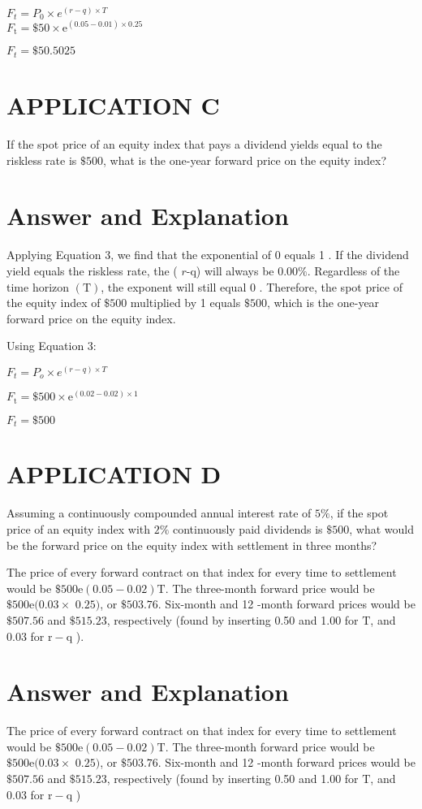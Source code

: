 \documentclass[11pt]{article}
\begin{document}
$F_{t}=P_{0} \times e^{(r-q) \times T}$\\
$F_{\mathrm{t}}=\$ 50 \times \mathrm{e}^{(0.05-0.01) \times 0.25}$

$F_{t}=\$ 50.5025$

\section*{APPLICATION C}
If the spot price of an equity index that pays a dividend yields equal to the riskless rate is $\$ 500$, what is the one-year forward price on the equity index?

\section*{Answer and Explanation}
Applying Equation 3, we find that the exponential of 0 equals 1 . If the dividend yield equals the riskless rate, the ( $r$-q) will always be $0.00 \%$. Regardless of the time horizon $(\mathrm{T})$, the exponent will still equal 0 . Therefore, the spot price of the equity index of $\$ 500$ multiplied by 1 equals $\$ 500$, which is the one-year forward price on the equity index.

Using Equation 3:

$F_{t}=P_{o} \times e^{(r-q) \times T}$

$F_{\mathrm{t}}=\$ 500 \times \mathrm{e}^{(0.02-0.02) \times 1}$

$F_{t}=\$ 500$

\section*{APPLICATION D}
Assuming a continuously compounded annual interest rate of $5 \%$, if the spot price of an equity index with $2 \%$ continuously paid dividends is $\$ 500$, what would be the forward price on the equity index with settlement in three months?

The price of every forward contract on that index for every time to settlement would be $\$ 500 \mathrm{e}(0.05-0.02) \mathrm{T}$. The three-month forward price would be $\$ 500 \mathrm{e}(0.03 \times$ $0.25)$, or $\$ 503.76$. Six-month and 12 -month forward prices would be $\$ 507.56$ and $\$ 515.23$, respectively (found by inserting 0.50 and 1.00 for $\mathrm{T}$, and 0.03 for $\mathrm{r}-\mathrm{q}$ ).

\section*{Answer and Explanation}
The price of every forward contract on that index for every time to settlement would be $\$ 500 \mathrm{e}(0.05-0.02) \mathrm{T}$. The three-month forward price would be $\$ 500 \mathrm{e}(0.03 \times$ $0.25)$, or $\$ 503.76$. Six-month and 12 -month forward prices would be $\$ 507.56$ and $\$ 515.23$, respectively (found by inserting 0.50 and 1.00 for $\mathrm{T}$, and 0.03 for $\mathrm{r}-\mathrm{q}$ )
\end{document}

